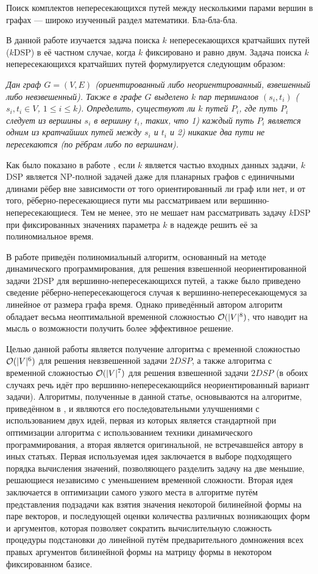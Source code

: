 \Introduction

Поиск комплектов непересекающихся путей между несколькими парами вершин в графах --- широко изученный раздел математики. Бла-бла-бла.

В данной работе изучается задача поиска $k$ непересекающихся кратчайших путей ($k$DSP) в её частном случае, когда $k$ фиксировано и равно двум. Задача поиска $k$ непересекающихся кратчайших путей формулируется следующим образом:

\emph{Дан граф $G = (V, E)$ (ориентированный либо неориентированный, взвешенный либо невзвешенный). Также в графе $G$ выделено $k$ пар терминалов $(s_i, t_i)$ ($s_i, t_i \in V$, $1 \leq i \leq k$). Определить, существуют ли $k$ путей $P_i$, где путь $P_i$ следует из вершины $s_i$ в вершину $t_i$, таких, что 1) каждый путь $P_i$ является одним из кратчайших путей между $s_i$ и $t_i$ и 2) никакие два пути не пересекаются (по рёбрам либо по вершинам).}

Как было показано в работе \cite{ET}, если $k$ является частью входных данных задачи, $k$DSP является NP-полной задачей даже для планарных графов с единичными длинами рёбер вне зависимости от того ориентированный ли граф или нет, и от того, рёберно-пересекающиеся пути мы рассматриваем или вершинно-непересекающиеся. Тем не менее, это не мешает нам рассматривать задачу $k$DSP при фиксированных значениях параметра $k$ в надежде решить её за полиномиальное время. 

В работе \cite{ET} приведён полиномиальный алгоритм, основанный на методе динамического программирования, для решения взвешенной неориентированной задачи $2$DSP для вершинно-непересекающихся путей, а также было приведено сведение рёберно-непересекающегося случая к вершинно-непересекающемуся за линейное от размера графа время. Однако приведённый автором алгоритм обладает весьма неоптимальной временной сложностью $\mathcal{O}(|V|^8)$, что наводит на мысль о возможности получить более эффективное решение.

Целью данной работы является получение алгоритма с временной сложностью $\mathcal{O}(|V|^6)$ для решения невзвешенной задачи $2DSP$, а также алгоритма с временной сложностью $\mathcal{O}(|V|^7)$ для решения взвешенной задачи $2DSP$ (в обоих случаях речь идёт про вершинно-непересекающийся неориентированный вариант задачи). Алгоритмы, полученные в данной статье, основываются на алгоритме, приведённом в \cite{ET}, и являются его последовательными улучшениями с использованием двух идей, первая из которых является стандартной при оптимизации алгоритма с использованием техники динамического программирования, а вторая является оригинальной, не встречавшейся автору в иных статьях. Первая используемая идея заключается в выборе подходящего порядка вычисления значений, позволяющего разделить задачу на две меньшие, решающиеся независимо с уменьшением временной сложности. Вторая идея заключается в оптимизации самого узкого места в алгоритме путём представления подзадачи как взятия значения некоторой билинейной формы на паре векторов, и последующей оценки количества различных возникающих форм и аргументов, которая позволяет сократить вычислительную сложность процедуры подстановки до линейной путём предварительного домножения всех правых аргументов билинейной формы на матрицу формы в некотором фиксированном базисе.

